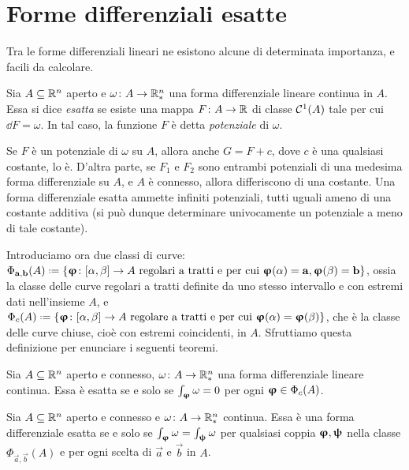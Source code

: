 \section{Forme differenziali esatte}
Tra le forme differenziali lineari ne esistono alcune di determinata importanza, e facili da calcolare.
\begin{definizione} \label{d:forma-diff-esatta}
	Sia $A\subseteq\mathbb{R}^n$ aperto e $\omega\colon A\to\mathbb{R}^n_*$ una forma differenziale lineare continua in $A$.
	Essa si dice \emph{esatta} se esiste una mappa $F\colon A\to\mathbb{R}$ di classe $\mathcal{C}^{{1}}(A)$ tale per cui $\dd F=\omega$.
	In tal caso, la funzione $F$ è detta \emph{potenziale} di $\omega$.
\end{definizione}
\begin{osservazione}
	Se $F$ è un potenziale di $\omega$ su $A$, allora anche $G=F+c$, dove $c$ è una qualsiasi costante, lo è.
	D'altra parte, se $F_1$ e $F_2$ sono entrambi potenziali di una medesima forma differenziale su $A$, e $A$ è connesso, allora differiscono di una costante.%
	Una forma differenziale esatta ammette infiniti potenziali, tutti uguali ameno di una costante additiva (si può dunque determinare univocamente un potenziale a meno di tale costante).
\end{osservazione}
Introduciamo ora due classi di curve: $\Phi_{\vec a,\vec b}(A)\defeq\{\vphi\colon[\alpha,\beta]\to A\text{ regolari a tratti e per cui }\vphi(\alpha)=\vec a, \vphi(\beta)=\vec b\}$, ossia la classe delle curve regolari a tratti definite da uno stesso intervallo e con estremi dati nell'insieme $A$, e $\Phi_c(A)\defeq\{\vphi\colon[\alpha,\beta]\to A\text{ regolare a tratti e per cui }\vphi(\alpha)=\vphi(\beta)\}$, che è la classe delle curve chiuse, cioè con estremi coincidenti, in $A$.
Sfruttiamo questa definizione per enunciare i seguenti teoremi.
\begin{teorema}
	Sia $A\subseteq\mathbb{R}^n$ aperto e connesso, $\omega\colon A\to\mathbb{R}^n_*$ una forma differenziale lineare continua.
	Essa è esatta se e solo se $\int_{\bm{\upvarphi}}\omega=0$ per ogni $\bm{\upvarphi}\in\Phi_c(A)$.
\end{teorema}
\begin{teorema}
	Sia $A\subseteq\mathbb{R}^n$ aperto e connesso e $\omega\colon A\to\mathbb{R}^n_*$ continua.
	Essa è una forma differenziale esatta se e solo se $\int_{\bm{\upvarphi}}\omega=\int_{\bm{\uppsi}}\omega$ per qualsiasi coppia $\bm{\upvarphi},\bm{\uppsi}$ nella classe $\Phi_{\vec a,\vec b}(A)$ e per ogni scelta di $\vec a$ e $\vec b$ in $A$.
\end{teorema}
